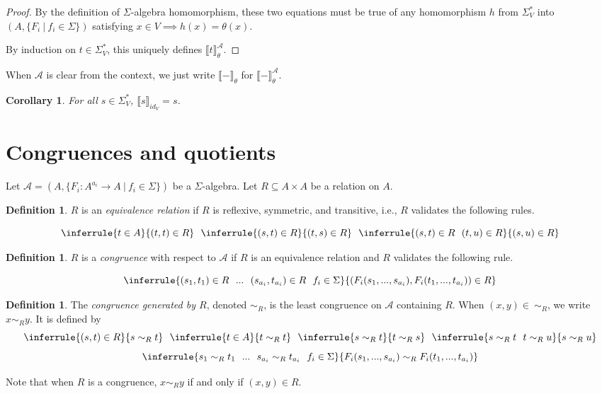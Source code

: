 \documentclass{msthesis}
\newtheorem{corollary}[theorem]{Corollary}
\theoremstyle{definition}
\newtheorem{definition}[theorem]{Definition}
\newcommand{\semof}[1]{\llbracket{#1}\rrbracket}
\newcommand{\Lmod}{\mathscr{L}}
\newcommand{\Amod}{\mathscr{A}}
\begin{document}
\begin{proof}
    By the definition of $\Sigma$-algebra homomorphism, these two equations must be true of any homomorphism $h$ from $\Sigma^*_V$ into $(A, \{F_i\ |\ f_i \in \Sigma\})$ satisfying  $x \in V \implies h(x) = \theta(x)$.
    
    By induction on $t \in \Sigma^*_V$, this uniquely defines $\semof{t}_\theta^\Amod$.
\end{proof}

When $\Amod$ is clear from the context, we just write $\semof{-}_\theta$ for $\semof{-}_\theta^\Amod$.

\begin{corollary}
    For all $s \in \Sigma^*_V$, $\semof{s}_{id_V} = s$.
\end{corollary}



\section{Congruences and quotients}
\newcommand{\thof}[1]{\ensuremath{E^*_{#1}}}

Let $\Amod = (A, \{F_i : A^{a_i} \to A\ |\ f_i \in \Sigma\})$ be a $\Sigma$-algebra. Let $R \subseteq A \times A$ be a relation on $A$.

\begin{definition}
    $R$ is an \emph{equivalence relation} if $R$ is reflexive, symmetric, and transitive, i.e., $R$ validates the following rules.

    \[ 
    \inferrule{t \in A}{(t, t) \in R}\ \ \inferrule{(s, t) \in R}{(t, s) \in R}\ \ 
    \inferrule{(s, t) \in R\ \ (t, u) \in R}{(s, u) \in R}
    \] 
\end{definition}

\begin{definition}
    $R$ is a \emph{congruence} with respect to $\Amod$ if $R$ is an equivalence relation and $R$ validates the following rule.

    \[ \inferrule{(s_1, t_1) \in R\ \ ...\ \ (s_{a_i}, t_{a_i}) \in R\ \ f_i \in \Sigma}{(F_i(s_1, ..., s_{a_i}), F_i(t_1, ..., t_{a_i})) \in R} 
    \]
\end{definition}

\begin{definition} \label{def:rel-cong}
The \emph{congruence generated by $R$}, denoted $\sim_R$, is the least congruence on $\Amod$ containing $R$. 
When $(x,y) \in\ \sim_R$, we write $x \sim_R y$. It is defined by 
\[
    \inferrule{(s, t) \in R}{s \sim_R t}\ \ 
    \inferrule{t \in A}{t \sim_R t}\ \ \inferrule{s \sim_R t}{t \sim_R s}\ \ 
    \inferrule{s \sim_R t\ \ t \sim_R u}{s \sim_R u} 
\]
\[
    \inferrule{s_1 \sim_R t_1\ \ ...\ \ s_{a_i} \sim_R t_{a_i}\ \ f_i \in \Sigma}{F_i(s_1, ..., s_{a_i}) \sim_R F_i(t_1, ..., t_{a_i})} 
\] 
\end{definition}
Note that when $R$ is a congruence, $x \sim_R y$ if and only if $(x,y) \in R$.
\end{document}
